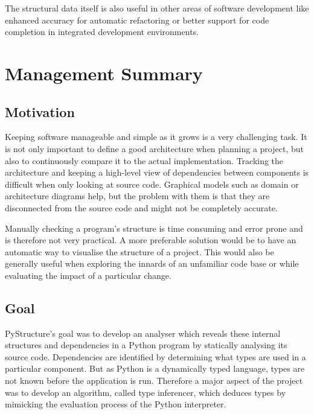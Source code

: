 \documentclass[12pt,halfparskip,DIV11,BCOR10mm]{scrreprt}
\begin{document}
The structural data itself is also useful in other areas of software development like enhanced accuracy for automatic refactoring or better support for code completion in integrated development environments.



\chapter*{Management Summary}

\section*{Motivation}

Keeping software manageable and simple as it grows is a very challenging task. 
It is not only important to define a good architecture when planning a project, but also to continuously compare it to the actual implementation. Tracking the architecture and keeping a high-level view of dependencies between components is difficult when only looking at source code. Graphical models such as domain or architecture diagrams help, but the problem with them is that they are disconnected from the source code and might not be completely accurate.

Manually checking a program's structure is time consuming and error prone and is therefore not very practical. A more preferable solution would be to have an automatic way to visualise the structure of a project. This would also be generally useful when exploring the innards of an unfamiliar code base or while evaluating the impact of a particular change.

\section*{Goal}

PyStructure's goal was to develop an analyser which reveals these internal structures and dependencies in a Python program by statically analysing its source code. Dependencies are identified by determining what types are used in a particular component. But as Python is a dynamically typed language, types are not known before the application is run. Therefore a major aspect of the project was to develop an algorithm, called type inferencer, which deduces types by mimicking the evaluation process of the Python interpreter.
\end{document}
